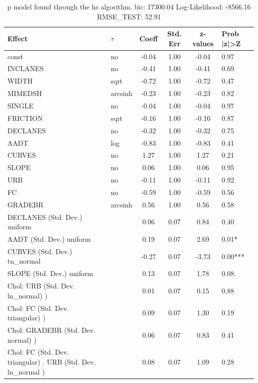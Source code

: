 \begin{table}
	\caption{p model found through the hs algorithm. bic: 17300.04 Log-Likelihood: -8566.16 RMSE_TEST: 52.91}
	\begin{center}
		\begin{tabular}{|l|l|c|c|c|l|}
			\hline
			Effect & $\tau$ & Coeff & Std. Err & z-values & Prob |z|>Z \\
			\hline
			const & no & -0.04 & 1.00 & -0.04 & 0.97 \\
			\hline
			INCLANES & no & -0.41 & 1.00 & -0.41 & 0.69 \\
			\hline
			WIDTH & sqrt & -0.72 & 1.00 & -0.72 & 0.47 \\
			\hline
			MIMEDSH & arcsinh & -0.23 & 1.00 & -0.23 & 0.82 \\
			\hline
			SINGLE & no & -0.04 & 1.00 & -0.04 & 0.97 \\
			\hline
			FRICTION & sqrt & -0.16 & 1.00 & -0.16 & 0.87 \\
			\hline
			DECLANES & no & -0.32 & 1.00 & -0.32 & 0.75 \\
			\hline
			AADT & log & -0.83 & 1.00 & -0.83 & 0.41 \\
			\hline
			CURVES & no & 1.27 & 1.00 & 1.27 & 0.21 \\
			\hline
			SLOPE & no & 0.06 & 1.00 & 0.06 & 0.95 \\
			\hline
			URB & no & -0.11 & 1.00 & -0.11 & 0.92 \\
			\hline
			FC & no & -0.59 & 1.00 & -0.59 & 0.56 \\
			\hline
			GRADEBR & arcsinh & 0.56 & 1.00 & 0.56 & 0.58 \\
			\hline
			DECLANES (Std. Dev.) uniform &  & 0.06 & 0.07 & 0.84 & 0.40 \\
			\hline
			AADT (Std. Dev.) uniform &  & 0.19 & 0.07 & 2.69 & 0.01* \\
			\hline
			CURVES (Std. Dev.) tn_normal &  & -0.27 & 0.07 & -3.73 & 0.00*** \\
			\hline
			SLOPE (Std. Dev.) uniform &  & 0.13 & 0.07 & 1.78 & 0.08. \\
			\hline
			 Chol: URB (Std. Dev. ln_normal) ) &  & 0.01 & 0.07 & 0.15 & 0.88 \\
			\hline
			 Chol: FC (Std. Dev. triangular) ) &  & 0.09 & 0.07 & 1.30 & 0.19 \\
			\hline
			 Chol: GRADEBR (Std. Dev. normal) ) &  & 0.06 & 0.07 & 0.83 & 0.41 \\
			\hline
			 Chol: FC (Std. Dev. triangular) . URB (Std. Dev.   ln_normal ) &  & 0.08 & 0.07 & 1.09 & 0.28 \\

\end{tabular}
\end{center}
\end{table}
